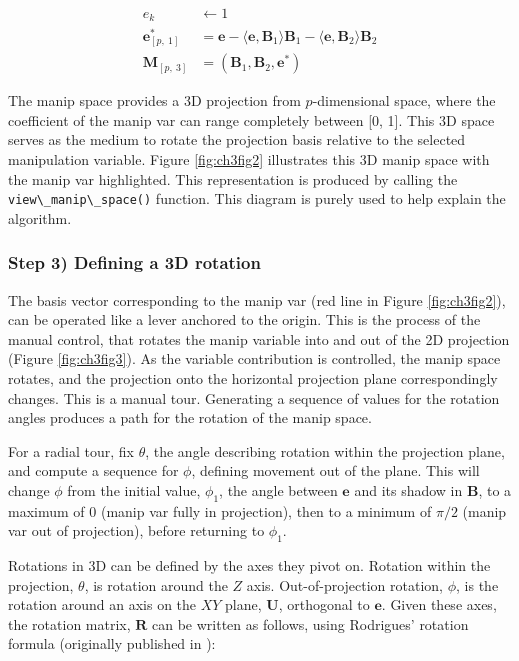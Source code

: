 \documentclass{template/monashthesis}
\begin{document}
\begin{align*}
  e_k &\leftarrow 1 \\ 
  \textbf{e}^*_{[p,~1]} &= \textbf{e} - \langle \textbf{e}, \textbf{B}_1 \rangle \textbf{B}_1 - \langle \textbf{e}, \textbf{B}_2 \rangle \textbf{B}_2 \\ 
  \textbf{M}_{[p,~3]} &= (\textbf{B}_1,\textbf{B}_2,\textbf{e}^*)
\end{align*}

The manip space provides a 3D projection from \(p\)-dimensional space, where the coefficient of the manip var can range completely between {[}0, 1{]}. This 3D space serves as the medium to rotate the projection basis relative to the selected manipulation variable. Figure \ref{fig:ch3fig2} illustrates this 3D manip space with the manip var highlighted. This representation is produced by calling the \texttt{view\textbackslash{}\_manip\textbackslash{}\_space()} function. This diagram is purely used to help explain the algorithm.

\hypertarget{step-3-defining-a-3d-rotation}{%
\subsubsection{Step 3) Defining a 3D rotation}\label{step-3-defining-a-3d-rotation}}

The basis vector corresponding to the manip var (red line in Figure \ref{fig:ch3fig2}), can be operated like a lever anchored to the origin. This is the process of the manual control, that rotates the manip variable into and out of the 2D projection (Figure \ref{fig:ch3fig3}). As the variable contribution is controlled, the manip space rotates, and the projection onto the horizontal projection plane correspondingly changes. This is a manual tour. Generating a sequence of values for the rotation angles produces a path for the rotation of the manip space.

For a radial tour, fix \(\theta\), the angle describing rotation within the projection plane, and compute a sequence for \(\phi\), defining movement out of the plane. This will change \(\phi\) from the initial value, \(\phi_1\), the angle between \(\textbf{e}\) and its shadow in \(\textbf{B}\), to a maximum of \(0\) (manip var fully in projection), then to a minimum of \(\pi/2\) (manip var out of projection), before returning to \(\phi_1\).

Rotations in 3D can be defined by the axes they pivot on. Rotation within the projection, \(\theta\), is rotation around the \(Z\) axis. Out-of-projection rotation, \(\phi\), is the rotation around an axis on the \(XY\) plane, \(\textbf{U}\), orthogonal to \(\textbf{e}\). Given these axes, the rotation matrix, \(\textbf{R}\) can be written as follows, using Rodrigues' rotation formula (originally published in \textcite{rodrigues_lois_1840}):
\end{document}
